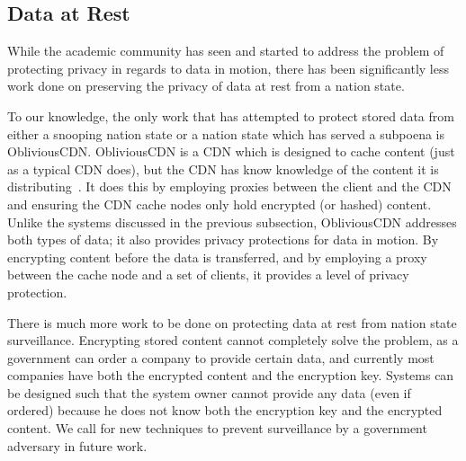\subsection{Data at Rest}
While the academic community has seen and started to address the problem of protecting privacy in regards to data in motion, there has been significantly less work done on preserving the privacy of data at rest from a nation state.  

To our knowledge, the only work that has attempted to protect stored data from either a snooping nation state or a nation state which has served a subpoena is ObliviousCDN.  ObliviousCDN is a CDN which is designed to cache content (just as a typical CDN does), but the CDN has know knowledge of the content it is distributing~\cite{edmundson2017cdn}.  It does this by employing proxies between the client and the CDN and ensuring the CDN cache nodes only hold encrypted (or hashed) content.  Unlike the systems discussed in the previous subsection, ObliviousCDN addresses both types of data; it also provides privacy protections for data in motion.  By encrypting content before the data is transferred, and by employing a proxy between the cache node and a set of clients, it provides a level of privacy protection.  

There is much more work to be done on protecting data at rest from nation state surveillance.  Encrypting stored content cannot completely solve the problem, as a government can order a company to provide certain data, and currently most companies have both the encrypted content and the encryption key.  Systems can be designed such that the system owner cannot provide any data (even if ordered) because he does not know both the encryption key and the encrypted content.  We call for new techniques to prevent surveillance by a government adversary in future work.
